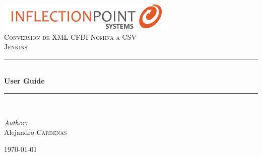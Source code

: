 \documentclass[12pt]{article} %
\begin{document}

\begin{titlepage}

\newcommand{\HRule}{\rule{\linewidth}{0.5mm}} %

\center %
{\includegraphics{iPointSystems}}\\[1cm] %

\textsc{\Large Conversion de XML CFDI Nomina a CSV}\\[0.5cm] %
\textsc{\large Jenkins}\\[0.5cm] %

\HRule \\[0.4cm]
{ \huge \bfseries User Guide}\\[0.4cm] %
\HRule \\[1.5cm]

\begin{flushleft} \large
\emph{Author:}\\
Alejandro \textsc{Cardenas} %
\end{flushleft}



{\large \today}\\[3cm] %



\vfill %

\end{titlepage}


\tableofcontents %

\newpage %
\end{document}
